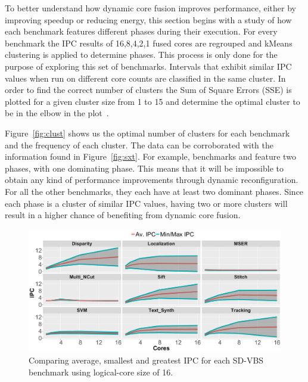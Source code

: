To better understand how dynamic core fusion improves performance, either by improving speedup or reducing energy, this section begins with a study of how each benchmark features different phases during their execution.
For every benchmark the IPC results of 16,8,4,2,1 fused cores are regrouped and kMeans clustering is applied to determine phases.
This process is only done for the purpose of exploring this set of benchmarks.
Intervals that exhibit similar IPC values when run on different core counts are classified in the same cluster.
In order to find the correct number of clusters the Sum of Square Errors (SSE) is plotted for a given cluster size from 1 to 15 and determine the optimal cluster to be in the elbow in the plot~\cite{everitCluster2001}.

Figure~\ref{fig:clust} shows us the optimal number of clusters for each benchmark and the frequency of each cluster.
The data can be corroborated with the information found in Figure~\ref{fig:sxt}.
For example, benchmarks  and  feature two phases, with one dominating phase.
This means that it will be impossible to obtain any kind of performance improvements through dynamic reconfiguration.
For all the other benchmarks, they each have at least two dominant phases.
Since each phase is a cluster of similar IPC values, having two or more clusters will result in a higher chance of benefiting from dynamic core fusion.


\begin{figure}
    \centering
    \includegraphics[width=1\textwidth]{cases-paper/graphics/Exploration/stddev2.pdf}
    \caption{Comparing average, smallest and greatest IPC for each SD-VBS benchmark using logical-core size of 16.}
    \label{fig:stddev}
		\vspace{5mm}
\end{figure}

